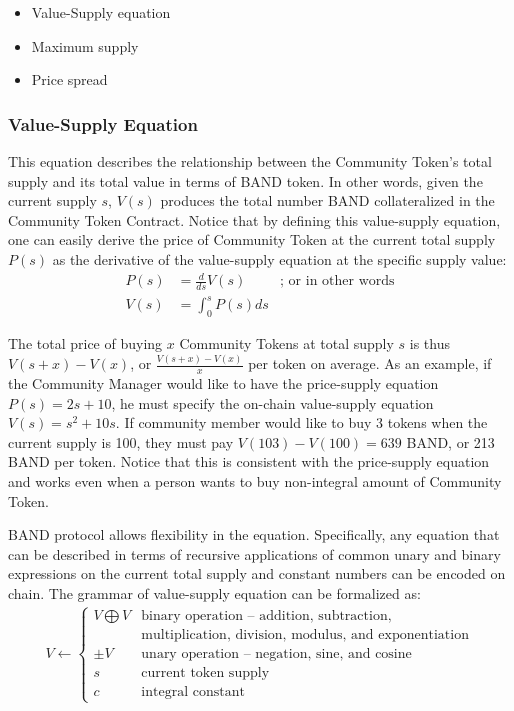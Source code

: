 \documentclass[letterpaper,11pt]{article}
\begin{document}
\begin{itemize}
\setlength\itemsep{0em}
\item Value-Supply equation
\item Maximum supply
\item Price spread
\end{itemize}

\subsubsection{Value-Supply Equation} This equation describes the relationship between the Community Token's total supply and its total value in terms of BAND token. In other words, given the current supply $s$, $V(s)$ produces the total number BAND collateralized in the Community Token Contract. Notice that by defining this value-supply equation, one can easily derive the price of Community Token at the current total supply $P(s)$ as the derivative of the value-supply equation at the specific supply value:
\bigbreak
\begin{align*}
P(s) &= \frac{d}{ds}V(s) & \text{; or in other words} \\
V(s) &= \int_{0}^{s} P(s) ds
\end{align*}

The total price of buying $x$ Community Tokens at total supply $s$ is thus $V(s+x)-V(x)$, or $\frac{V(s+x)-V(x)}{x}$ per token on average. As an example, if the Community Manager would like to have the price-supply equation $P(s) = 2s + 10$, he must specify the on-chain value-supply equation $V(s) = s^2 + 10s$. If community member would like to buy 3 tokens when the current supply is 100, they must pay $V(103)-V(100) =639$ BAND, or 213 BAND per token. Notice that this is consistent with the price-supply equation and works even when a person wants to buy non-integral amount of Community Token.

BAND protocol allows flexibility in the equation. Specifically, any equation that can be described in terms of recursive applications of common unary and binary expressions on the current total supply and constant numbers can be encoded on chain. The grammar of value-supply equation can be formalized as:
\begin{align*}
V \leftarrow
\begin{cases}
V \bigoplus V & \text{binary operation -- addition, subtraction, } \\
& \text{multiplication, division, modulus, and exponentiation} \\
\pm V & \text{unary operation -- negation, sine, and cosine} \\
s & \text{current token supply} \\
c & \text{integral constant}
\end{cases}
\end{align*}
\end{document}
